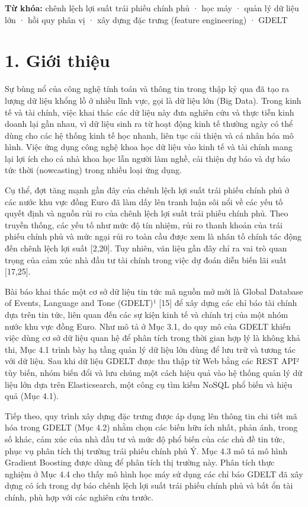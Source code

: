 \textbf{Từ khóa:} chênh lệch lợi suất trái phiếu chính phủ · học máy · quản lý dữ liệu lớn · hồi quy phân vị · xây dựng đặc trưng (feature engineering) · GDELT

\section{1. Giới thiệu}

Sự bùng nổ của công nghệ tính toán và thông tin trong thập kỷ qua đã tạo ra lượng dữ liệu khổng lồ ở nhiều lĩnh vực, gọi là dữ liệu lớn (Big Data). Trong kinh tế và tài chính, việc khai thác các dữ liệu này đưa nghiên cứu và thực tiễn kinh doanh lại gần nhau, vì dữ liệu sinh ra từ hoạt động kinh tế thường ngày có thể dùng cho các hệ thống kinh tế học nhanh, liên tục cải thiện và cá nhân hóa mô hình. Việc ứng dụng công nghệ khoa học dữ liệu vào kinh tế và tài chính mang lại lợi ích cho cả nhà khoa học lẫn người làm nghề, cải thiện dự báo và dự báo tức thời (nowcasting) trong nhiều loại ứng dụng.

Cụ thể, đợt tăng mạnh gần đây của chênh lệch lợi suất trái phiếu chính phủ ở các nước khu vực đồng Euro đã làm dấy lên tranh luận sôi nổi về các yếu tố quyết định và nguồn rủi ro của chênh lệch lợi suất trái phiếu chính phủ. Theo truyền thống, các yếu tố như mức độ tín nhiệm, rủi ro thanh khoản của trái phiếu chính phủ và mức ngại rủi ro toàn cầu được xem là nhân tố chính tác động đến chênh lệch lợi suất {[}2,20{]}. Tuy nhiên, văn liệu gần đây chỉ ra vai trò quan trọng của cảm xúc nhà đầu tư tài chính trong việc dự đoán diễn biến lãi suất {[}17,25{]}.

Bài báo khai thác một cơ sở dữ liệu tin tức mã nguồn mở mới là Global Database of Events, Language and Tone (GDELT)¹ {[}15{]} để xây dựng các chỉ báo tài chính dựa trên tin tức, liên quan đến các sự kiện kinh tế và chính trị của một nhóm nước khu vực đồng Euro. Như mô tả ở Mục 3.1, do quy mô của GDELT khiến việc dùng cơ sở dữ liệu quan hệ để phân tích trong thời gian hợp lý là không khả thi, Mục 4.1 trình bày hạ tầng quản lý dữ liệu lớn dùng để lưu trữ và tương tác với dữ liệu. Sau khi dữ liệu GDELT được thu thập từ Web bằng các REST API² tùy biến, nhóm biến đổi và lưu chúng một cách hiệu quả vào hệ thống quản lý dữ liệu lớn dựa trên Elasticsearch, một công cụ tìm kiếm NoSQL phổ biến và hiệu quả (Mục 4.1).

Tiếp theo, quy trình xây dựng đặc trưng được áp dụng lên thông tin chi tiết mã hóa trong GDELT (Mục 4.2) nhằm chọn các biến hữu ích nhất, phản ánh, trong số khác, cảm xúc của nhà đầu tư và mức độ phổ biến của các chủ đề tin tức, phục vụ phân tích thị trường trái phiếu chính phủ Ý. Mục 4.3 mô tả mô hình Gradient Boosting được dùng để phân tích thị trường này. Phân tích thực nghiệm ở Mục 4.4 cho thấy mô hình học máy sử dụng các chỉ báo GDELT đã xây dựng có ích trong dự báo chênh lệch lợi suất trái phiếu chính phủ và bất ổn tài chính, phù hợp với các nghiên cứu trước.

